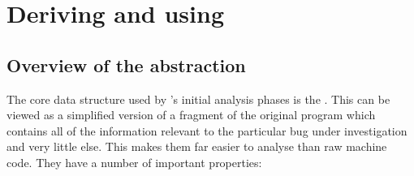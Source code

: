\chapter{Deriving and using \StateMachines}

\section{Overview of the {\StateMachine} abstraction}

The core data structure used by {\technique}'s initial analysis phases
is the {\StateMachine}.  This can be viewed as a simplified version of
a fragment of the original program which contains all of the
information relevant to the particular bug under investigation and
very little else.  This makes them far easier to analyse than raw
machine code.  They have a number of important properties:

